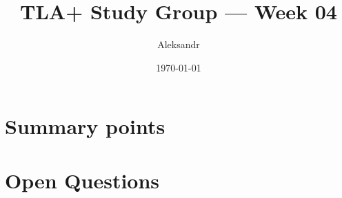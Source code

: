 \documentclass[11pt]{article}
\title{TLA+ Study Group — Week 04}
\author{Aleksandr}
\date{\today}
\begin{document}
\maketitle

\section*{Summary points}
\begin{itemize}
\end{itemize}

\section*{Open Questions}
\begin{itemize}
\end{itemize}
\end{document}
